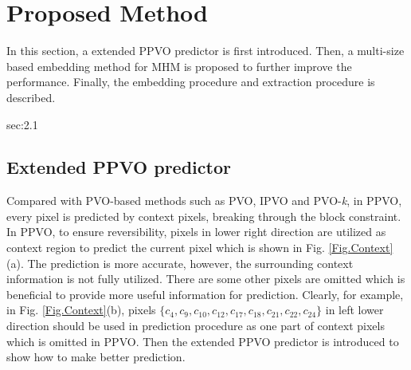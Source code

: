 \documentclass[review,3p,10pt,sort&compress]{elsarticle}
\begin{document}
\section{Proposed Method}\label{sec:3}
In this section, a extended PPVO predictor is first introduced. Then, a multi-size based embedding method for MHM is proposed to further improve the performance. Finally, the embedding procedure and extraction procedure is described.

sec:2.1\subsection{Extended PPVO predictor}\label{sec:3.1}
Compared with PVO-based methods such as PVO\cite{Li2013PVO}, IPVO\cite{Peng2014IPVO} and PVO-\emph{k}\cite{Ou2014PVOk}, in PPVO, every pixel is predicted by context pixels, breaking through the block constraint. In PPVO, to ensure reversibility, pixels in lower right direction are utilized as context region to predict the current pixel which is shown in Fig. \ref{Fig.Context}(a). The prediction is more accurate, however, the surrounding context information is not fully utilized. There are some other pixels are omitted which is beneficial to provide more useful information for prediction. Clearly, for example, in Fig. \ref{Fig.Context}(b), pixels $\{c_{4}, c_{9}, c_{10}, c_{12}, c_{17}, c_{18}, c_{21}, c_{22}, c_{24}\}$ in left lower direction should be used in prediction procedure as one part of context pixels which is omitted in PPVO. Then the extended PPVO predictor is introduced to show how to make better prediction.
\end{document}
